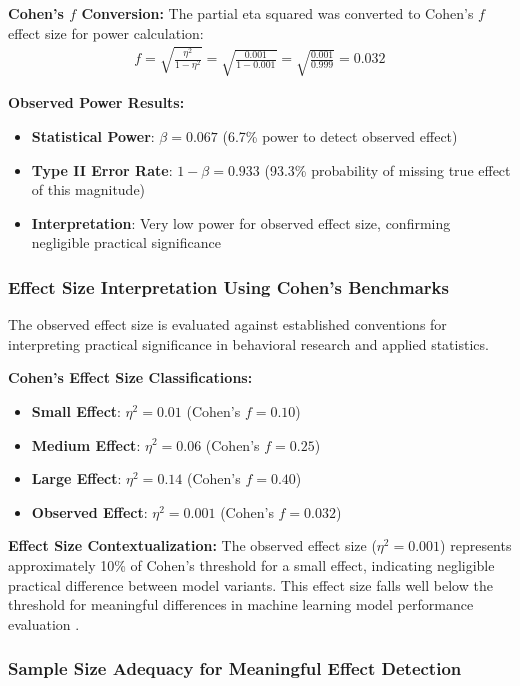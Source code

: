 \textbf{Cohen's $f$ Conversion:}
The partial eta squared was converted to Cohen's $f$ effect size for power calculation:
\begin{align}
f = \sqrt{\frac{\eta^2}{1 - \eta^2}} = \sqrt{\frac{0.001}{1 - 0.001}} = \sqrt{\frac{0.001}{0.999}} = 0.032
\end{align}

\textbf{Observed Power Results:}
\begin{itemize}
    \item \textbf{Statistical Power}: $\beta = 0.067$ (6.7\% power to detect observed effect)
    \item \textbf{Type II Error Rate}: $1 - \beta = 0.933$ (93.3\% probability of missing true effect of this magnitude)
    \item \textbf{Interpretation}: Very low power for observed effect size, confirming negligible practical significance
\end{itemize}

\subsubsection{Effect Size Interpretation Using Cohen's Benchmarks}

The observed effect size is evaluated against established conventions for interpreting practical significance in behavioral research and applied statistics.

\textbf{Cohen's Effect Size Classifications:}
\begin{itemize}
    \item \textbf{Small Effect}: $\eta^2 = 0.01$ (Cohen's $f = 0.10$)
    \item \textbf{Medium Effect}: $\eta^2 = 0.06$ (Cohen's $f = 0.25$)
    \item \textbf{Large Effect}: $\eta^2 = 0.14$ (Cohen's $f = 0.40$)
    \item \textbf{Observed Effect}: $\eta^2 = 0.001$ (Cohen's $f = 0.032$)
\end{itemize}

\textbf{Effect Size Contextualization:}
The observed effect size ($\eta^2 = 0.001$) represents approximately 10\% of Cohen's threshold for a small effect, indicating negligible practical difference between model variants. This effect size falls well below the threshold for meaningful differences in machine learning model performance evaluation \cite{madaan2024quantifying_variance}.

\subsubsection{Sample Size Adequacy for Meaningful Effect Detection}

